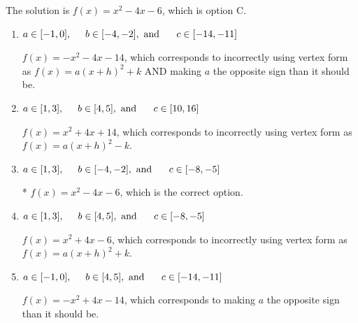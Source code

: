 \documentclass{extbook}[14pt]
\begin{document}
\begin{enumerate}
{The solution is \( f(x) = x^{2} -4 x -6 \), which is option C.\begin{enumerate}[label=\Alph*.]
\item \( a \in [-1, 0], \hspace*{5mm} b \in [-4, -2], \text{ and } \hspace*{5mm} c \in [-14, -11] \)

$f(x)=-x^{2} -4 x -14$, which corresponds to incorrectly using vertex form as $f(x) = a(x+h)^2+k$ AND making $a$ the opposite sign than it should be.
\item \( a \in [1, 3], \hspace*{5mm} b \in [4, 5], \text{ and } \hspace*{5mm} c \in [10, 16] \)

$f(x)=x^{2} +4 x + 14$, which corresponds to incorrectly using vertex form as $f(x) = a(x+h)^2 - k$.
\item \( a \in [1, 3], \hspace*{5mm} b \in [-4, -2], \text{ and } \hspace*{5mm} c \in [-8, -5] \)

* $f(x)=x^{2} -4 x -6$, which is the correct option.
\item \( a \in [1, 3], \hspace*{5mm} b \in [4, 5], \text{ and } \hspace*{5mm} c \in [-8, -5] \)

$f(x)=x^{2} +4 x -6$, which corresponds to incorrectly using vertex form as $f(x) = a(x+h)^2+k$.
\item \( a \in [-1, 0], \hspace*{5mm} b \in [4, 5], \text{ and } \hspace*{5mm} c \in [-14, -11] \)

$f(x)=-x^{2} +4 x -14$, which corresponds to making $a$ the opposite sign than it should be.
\end{enumerate}

}
\end{enumerate}
\end{document}
